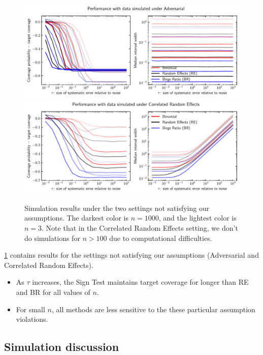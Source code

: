 \documentclass[12pt]{article}
\begin{document}
\begin{figure}[h]
\centering
\includegraphics[width=\textwidth]{figs/performance_adversarial.pdf}
\includegraphics[width=\textwidth]{figs/performance_random_effects_corr.pdf}
\label{fig:sim-results2}
\caption{Simulation results under the two settings not satisfying our assumptions. The darkest color is $n=1000$, and the lightest color is $n=3$. Note that in the Correlated Random Effects setting, we don't do simulations for $n>100$ due to computational difficulties.}
\end{figure}



\ref{fig:sim-results2} contains results for the settings not satisfying our assumptions (Adversarial and Correlated Random Effects).

\begin{itemize}
\item
  As $\tau$ increases, the Sign Test maintains target coverage for longer than RE and BR for all values of $n$.
\item
  For small $n$, all methods are less sensitive to the these particular assumption violations.
\end{itemize}

\subsection{Simulation discussion}\label{simulation-discussion}
\end{document}
